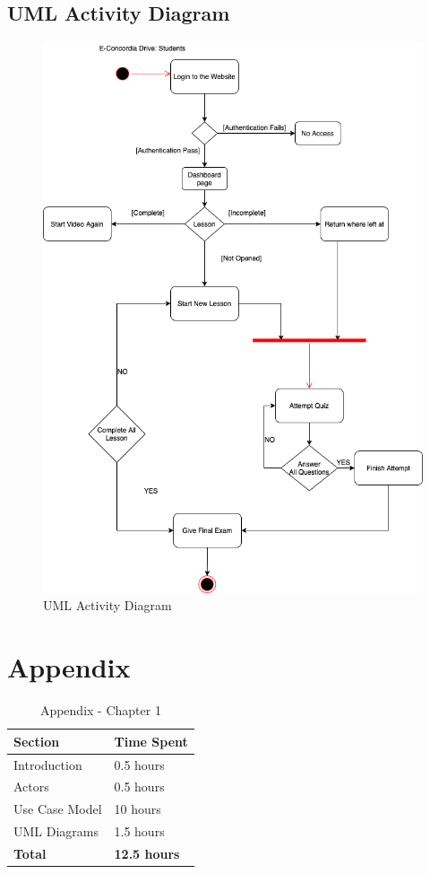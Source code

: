 \documentclass{report}
\begin{document}
\subsection{UML Activity Diagram}
\begin{figure}[htb!]
    \centering
    \includegraphics[scale=0.5]{AD.png}
    \caption{UML Activity Diagram}
    \label{fig:my_label}
\end{figure}

\section{Appendix}
\begin{table}[htb!]
    \centering
    \begin{tabular}{|p{5.5cm}|p{6.5cm}|}\hline
    \textbf{Section} & \textbf{Time Spent} \\ \hline
    Introduction & 0.5 hours \\ \hline
    Actors & 0.5 hours \\ \hline
    Use Case Model & 10 hours \\ \hline
    UML Diagrams & 1.5 hours \\ \hline
    \textbf{Total} & \textbf{12.5 hours} \\ \hline
\end{tabular}
    \caption{Appendix - Chapter 1}
    \label{tab:my_label}
\end{table}
\end{document}
